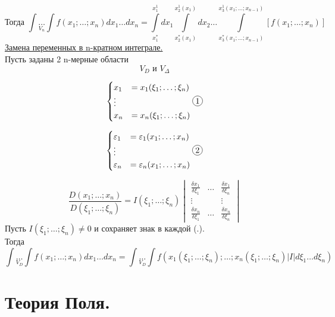 \documentclass[12pt]{article}
\newcommand*\circled[1]{\tikz[baseline=(char.base)]{
    \node[shape=circle, draw, inner sep=1pt, 
        minimum height=12pt] (char) {#1};}}
\let\oldint\int
\renewcommand{\int}{\oldint\limits}
\begin{document}
  \[\text{Тогда } \int \underset{V_n}{\dots} \int f(x_1;\dots;x_n) dx_1 \dots dx_n=
  \int_{x_1^*}^{x_1^1}dx_1 \int_{x_2^*(x_1)}^{x_2^1(x_1)}dx_2 \dots \int_{x_3^*(x_1;\dots;x_{n-1})}^{x_3^1(x_1;\dots;x_{n-1})}
  [f(x_1;\dots;x_n)]\]
  \underline{Замена переменных в n-кратном интеграле.}\\
  Пусть заданы 2 n-мерные области
  \[V_D \text{ и } V_\Delta\]
  \begin{minipage}{0.45\textwidth}
    \[\begin{cases}
      x_1&=x_1(\xi_1;\dots;\xi_n)\\
      \vdots&\\
      x_n&=x_n(\xi_1;\dots;\xi_n)
    \end{cases} \circled{1}\]
  \end{minipage}
  \hspace{1em}
  \begin{minipage}{0.55\textwidth}
    \[\begin{cases}
      \varepsilon_1&=\varepsilon_1(x_1;\dots;x_n)\\
      \vdots&\\
      \varepsilon_n&=\varepsilon_n(x_1;\dots;x_n)
    \end{cases} \circled{2}\]
  \end{minipage}
  \vspace{1em}
  \par
  \[\frac{D(x_1;\dots;x_n)}{D(\xi_1;\dots;\xi_n)}=I(\xi_1;\dots;\xi_n)
  \begin{vmatrix}
    \frac{\delta x_1}{\delta \xi_1}&\dots&\frac{\delta x_1}{\delta \xi_n}\\
    \vdots &&\vdots \\
    \frac{\delta x_n}{\delta \xi_1}&\dots&\frac{\delta x_n}{\delta \xi_n}
  \end{vmatrix}\]
  Пусть $I(\xi_1;\dots;\xi_n)\not =0$ и сохраняет знак в каждой (.).\\
  Тогда 
  \[\int \underset{V_D}{\dots} \int f(x_1;\dots;x_n)dx_1\dots dx_n = \int \underset{V_D}{\dots} \int 
  f(x_1(\xi_1;\dots;\xi_n);\dots;x_n(\xi_1;\dots;\xi_n)|I|d\xi_1\dots d\xi_n)\]
  \section{Теория Поля.}
\end{document}
